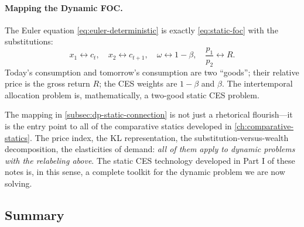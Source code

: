 \paragraph{Mapping the Dynamic FOC.}
The Euler equation \cref{eq:euler-deterministic} is exactly \cref{eq:static-foc} with the substitutions:
\[
x_1 \leftrightarrow c_t, \quad x_2 \leftrightarrow c_{t+1}, \quad \omega \leftrightarrow 1-\beta, \quad \frac{p_1}{p_2} \leftrightarrow R.
\]
Today's consumption and tomorrow's consumption are two ``goods''; their relative price is the gross return $R$; the CES weights are $1-\beta$ and $\beta$. The intertemporal allocation problem is, mathematically, a two-good static CES problem.

\begin{calloutimportant}
The mapping in \cref{subsec:dp-static-connection} is not just a rhetorical flourish---it is the entry point to all of the comparative statics developed in \cref{ch:comparative-statics}. The price index, the KL representation, the substitution-versus-wealth decomposition, the elasticities of demand: \emph{all of them apply to dynamic problems with the relabeling above}. The static CES technology developed in Part I of these notes is, in this sense, a complete toolkit for the dynamic problem we are now solving.
\end{calloutimportant}

\subsection{Summary}
\label{subsec:dp-euler-summary}

